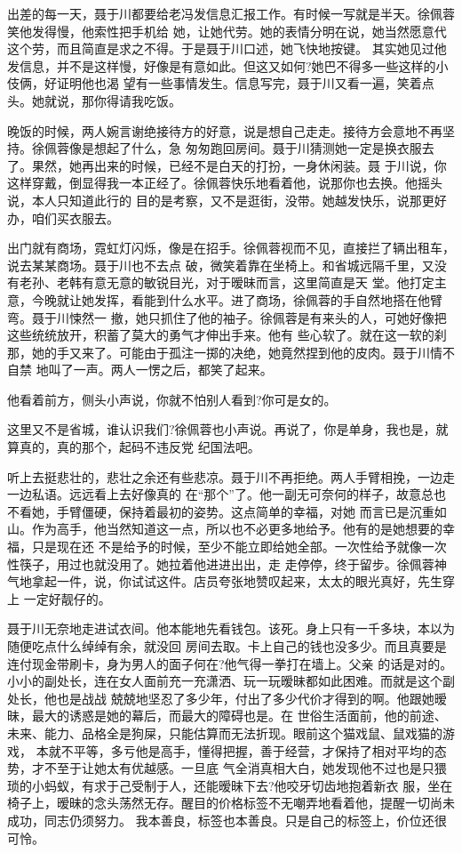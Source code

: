 \documentclass[11pt,a4paper,onecolumn]{article}
\begin{document}
出差的每一天，聂于川都要给老冯发信息汇报工作。有时候一写就是半天。徐佩蓉笑他发得慢，他索性把手机给
她，让她代劳。她的表情分明在说，她当然愿意代这个劳，而且简直是求之不得。于是聂于川口述，她飞快地按键。
其实她见过他发信息，并不是这样慢，好像是有意如此。但这又如何?她巴不得多一些这样的小伎俩，好证明他也渴
望有一些事情发生。信息写完，聂于川又看一遍，笑着点头。她就说，那你得请我吃饭。

晚饭的时候，两人婉言谢绝接待方的好意，说是想自己走走。接待方会意地不再坚持。徐佩蓉像是想起了什么，急
匆匆跑回房间。聂于川猜测她一定是换衣服去了。果然，她再出来的时候，已经不是白天的打扮，一身休闲装。聂
于川说，你这样穿戴，倒显得我一本正经了。徐佩蓉快乐地看着他，说那你也去换。他摇头说，本人只知道此行的
目的是考察，又不是逛街，没带。她越发快乐，说那更好办，咱们买衣服去。

出门就有商场，霓虹灯闪烁，像是在招手。徐佩蓉视而不见，直接拦了辆出租车，说去某某商场。聂于川也不去点
破，微笑着靠在坐椅上。和省城远隔千里，又没有老孙、老韩有意无意的敏锐目光，对于暧昧而言，这里简直是天
堂。他打定主意，今晚就让她发挥，看能到什么水平。进了商场，徐佩蓉的手自然地搭在他臂弯。聂于川悚然一
撤，她只抓住了他的袖子。徐佩蓉是有来头的人，可她好像把这些统统放开，积蓄了莫大的勇气才伸出手来。他有
些心软了。就在这一软的刹那，她的手又来了。可能由于孤注一掷的决绝，她竟然捏到他的皮肉。聂于川情不自禁
地叫了一声。两人一愣之后，都笑了起来。

他看着前方，侧头小声说，你就不怕别人看到?你可是女的。

这里又不是省城，谁认识我们?徐佩蓉也小声说。再说了，你是单身，我也是，就算真的，真的那个，起码不违反党
纪国法吧。

听上去挺悲壮的，悲壮之余还有些悲凉。聂于川不再拒绝。两人手臂相挽，一边走一边私语。远远看上去好像真的
在“那个”了。他一副无可奈何的样子，故意总也不看她，手臂僵硬，保持着最初的姿势。这点简单的幸福，对她
而言已是沉重如山。作为高手，他当然知道这一点，所以也不必更多地给予。他有的是她想要的幸福，只是现在还
不是给予的时候，至少不能立即给她全部。一次性给予就像一次性筷子，用过也就没用了。她拉着他进进出出，走
走停停，终于留步。徐佩蓉神气地拿起一件，说，你试试这件。店员夸张地赞叹起来，太太的眼光真好，先生穿上
一定好靓仔的。

聂于川无奈地走进试衣间。他本能地先看钱包。该死。身上只有一千多块，本以为随便吃点什么绰绰有余，就没回
房间去取。卡上自己的钱也没多少。而且真要是连付现金带刷卡，身为男人的面子何在?他气得一拳打在墙上。父亲
的话是对的。小小的副处长，连在女人面前充一充潇洒、玩一玩暧昧都如此困难。而就是这个副处长，他也是战战
兢兢地坚忍了多少年，付出了多少代价才得到的啊。他跟她暧昧，最大的诱惑是她的幕后，而最大的障碍也是。在
世俗生活面前，他的前途、未来、能力、品格全是狗屎，只能估算而无法折现。眼前这个猫戏鼠、鼠戏猫的游戏，
本就不平等，多亏他是高手，懂得把握，善于经营，才保持了相对平均的态势，才不至于让她太有优越感。一旦底
气全消真相大白，她发现他不过也是只猥琐的小蚂蚁，有求于己受制于人，还能暧昧下去?他咬牙切齿地抱着新衣
服，坐在椅子上，暧昧的念头荡然无存。醒目的价格标签不无嘲弄地看着他，提醒一切尚未成功，同志仍须努力。
我本善良，标签也本善良。只是自己的标签上，价位还很可怜。
\end{document}
